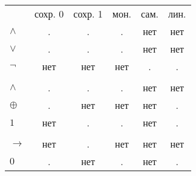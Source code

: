 \begin{tabular}{lccccc}
    &сохр. 0 & сохр. 1 & мон. & сам. & лин. \\
    $\wedge$&.&.&.&нет&нет\\
    $\vee$&.&.&.&нет&нет\\
    $\neg$&нет&нет&нет&.&.\\
    \hline \\
    $\wedge$&.&.&.&нет&нет \\
    $\oplus$&.&нет&нет&нет&. \\
    $1$&нет&.&.&нет&. \\
    \hline \\
    $\rightarrow$&нет&.&нет&нет&нет \\
    $0$&.&нет&.&нет&.
\end{tabular}
        
